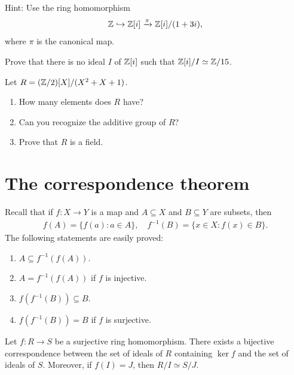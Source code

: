 Hint: Use 
the ring homomorphism 
\[
\mathbb{Z}\hookrightarrow\mathbb{Z}[i]\xrightarrow{\pi}\mathbb{Z}[i]/(1+3i),
\]
where
$\pi$ is the canonical map. 

\begin{exercise}
\label{xca:Z15}
	Prove that there is no ideal $I$ of $\mathbb{Z}[i]$ 
	such that $\mathbb{Z}[i]/I\simeq\mathbb{Z}/15$. 
\end{exercise}

\begin{exercise}
	Let $R=(\mathbb{Z}/2)[X]/(X^2+X+1)$. 
	\begin{enumerate}
		\item How many elements does $R$ have?
		\item Can you recognize the additive group of $R$?
		\item Prove that $R$ is a field. 	
	\end{enumerate}
\end{exercise}

\section{The correspondence theorem}

Recall that if $f\colon X\to Y$ is a map and $A\subseteq X$ and $B\subseteq Y$ are
subsets, then
\begin{align*}
    f(A)=\{f(a):a\in A\},\quad 
    f^{-1}(B)=\{x\in X:f(x)\in B\}.
\end{align*}
The following statements are easily proved:
\begin{enumerate}
	\item $A\subseteq f^{-1}(f(A))$. 
	\item $A=f^{-1}(f(A))$ if $f$ is injective. 
	\item $f(f^{-1}(B))\subseteq B$. 
	\item $f(f^{-1}(B))=B$ if $f$ is surjective. 
\end{enumerate}

\begin{theorem}
\label{thm:ring_correspondence}
	Let $f\colon R\to S$ be a surjective ring homomorphism. There exists a
	bijective correspondence between 
	the set of ideals of $R$ containing $\ker f$ and
	the set of ideals of $S$.  Moreover, if $f(I)=J$, then
	$R/I\simeq S/J$. 
\end{theorem}

